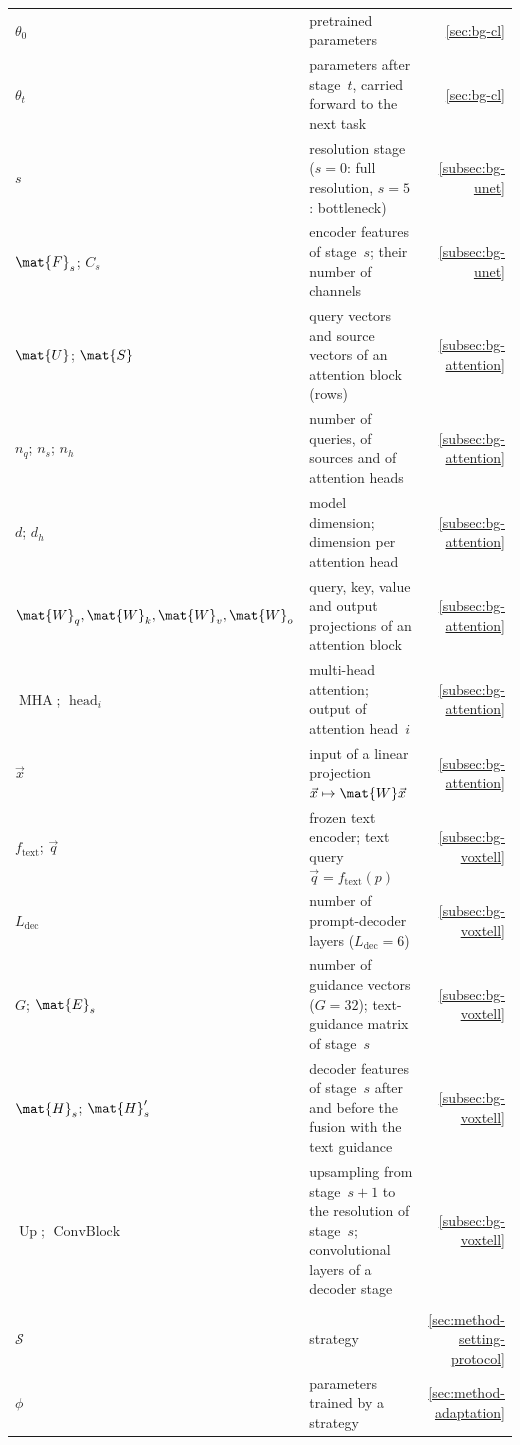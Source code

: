 {\begin{longtable}{@{}>{\raggedright\arraybackslash}p{3.4cm}>{\raggedright\arraybackslash}p{10.2cm}r@{}}
$\theta_0$ & pretrained parameters & \ref{sec:bg-cl} \\
$\theta_t$ & parameters after stage~$t$, carried forward to the next task & \ref{sec:bg-cl} \\
$s$ & resolution stage ($s = 0$: full resolution, $s = 5$: bottleneck) & \ref{subsec:bg-unet} \\
$\mat{F}_s$; $C_s$ & encoder features of stage~$s$; their number of channels & \ref{subsec:bg-unet} \\
$\mat{U}$; $\mat{S}$ & query vectors and source vectors of an attention block (rows) & \ref{subsec:bg-attention} \\
$n_q$; $n_s$; $n_h$ & number of queries, of sources and of attention heads & \ref{subsec:bg-attention} \\
$d$; $d_h$ & model dimension; dimension per attention head & \ref{subsec:bg-attention} \\
$\mat{W}_q, \mat{W}_k, \mat{W}_v, \mat{W}_o$ & query, key, value and output projections of an attention block & \ref{subsec:bg-attention} \\
$\operatorname{MHA}$; $\operatorname{head}_i$ & multi-head attention; output of attention head~$i$ & \ref{subsec:bg-attention} \\
$\vec{x}$ & input of a linear projection $\vec{x} \mapsto \mat{W}\vec{x}$ & \ref{subsec:bg-attention} \\
$f_{\mathrm{text}}$; $\vec{q}$ & frozen text encoder; text query $\vec{q} = f_{\mathrm{text}}(p)$ & \ref{subsec:bg-voxtell} \\
$L_{\mathrm{dec}}$ & number of prompt-decoder layers ($L_{\mathrm{dec}} = 6$) & \ref{subsec:bg-voxtell} \\
$G$; $\mat{E}_s$ & number of guidance vectors ($G = 32$); text-guidance matrix of stage~$s$ & \ref{subsec:bg-voxtell} \\
$\mat{H}_s$; $\mat{H}'_s$ & decoder features of stage~$s$ after and before the fusion with the text guidance & \ref{subsec:bg-voxtell} \\
$\operatorname{Up}$; $\operatorname{ConvBlock}$ & upsampling from stage~$s+1$ to the resolution of stage~$s$; convolutional layers of a decoder stage & \ref{subsec:bg-voxtell} \\
\addlinespace
\multicolumn{3}{@{}l}{\textit{Training}} \\*
$\mathcal{S}$ & strategy & \ref{sec:method-setting-protocol} \\
$\phi$ & parameters trained by a strategy & \ref{sec:method-adaptation} \\

\end{longtable}}
